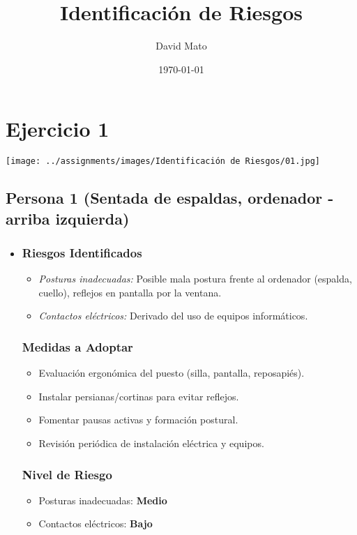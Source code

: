 \documentclass[12pt,a4paper]{article}
\title{Identificación de Riesgos}
\author{David Mato}
\date{\today}
\begin{document}
	\setcounter{tocdepth}{2}
	\maketitle
	
	\tableofcontents
	
	\section{Ejercicio 1}
	
	\texttt{[image: ../assignments/images/Identificación de Riesgos/01.jpg]}
	
	\subsection{Persona 1 (Sentada de espaldas, ordenador - arriba izquierda)}
	\label{subsec:persona1} %
	
	\begin{itemize}
		\item \subsubsection{Riesgos Identificados}
		\begin{itemize}
			\item \textit{Posturas inadecuadas:} Posible mala postura frente al ordenador (espalda, cuello), reflejos en pantalla por la ventana.
			\item \textit{Contactos eléctricos:} Derivado del uso de equipos informáticos.
		\end{itemize}
		\subsubsection{Medidas a Adoptar}
		\begin{itemize}
			\item Evaluación ergonómica del puesto (silla, pantalla, reposapiés).
			\item Instalar persianas/cortinas para evitar reflejos.
			\item Fomentar pausas activas y formación postural.
			\item Revisión periódica de instalación eléctrica y equipos.
		\end{itemize}
		\subsubsection{Nivel de Riesgo}
		\begin{itemize}
			\item Posturas inadecuadas: \textbf{Medio}
			\item Contactos eléctricos: \textbf{Bajo}
		\end{itemize}
	\end{itemize}
	
\end{document}
